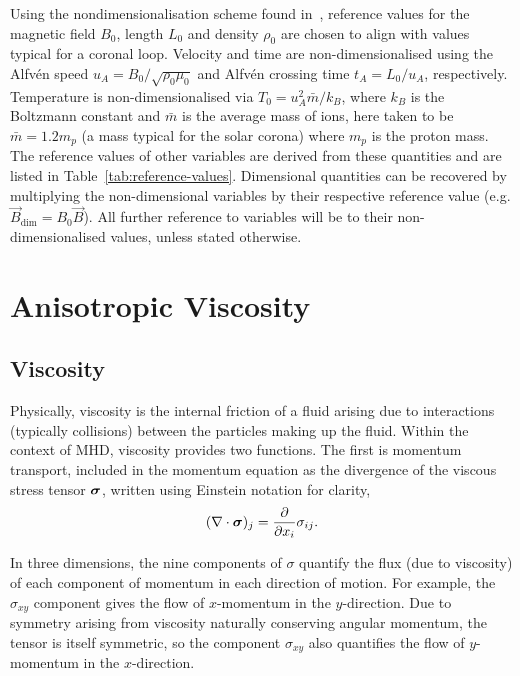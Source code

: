 Using the nondimensionalisation scheme found
in~\cite{arberStaggeredGridLagrangian2001}, reference values for the
magnetic field $B_0$, length $L_0$ and density $\rho_0$ are chosen to
align with values typical for a coronal loop. Velocity and time are
non-dimensionalised using the Alfv\'en speed $u_A = B_0 / \sqrt{\rho_0
  \mu_0}$ and Alfv\'en crossing time $t_A = L_0/u_A$,
respectively. Temperature is non-dimensionalised via $T_0 = u_A^2
\bar{m} / k_B$, where $k_B$ is the Boltzmann constant and $\bar{m}$ is
the average mass of ions, here taken to be $\bar{m} = 1.2m_p$ (a mass
typical for the solar corona) where $m_p$ is the proton mass. The
reference values of other variables are derived from these
quantities and are listed in Table~\ref{tab:reference-values}. Dimensional quantities can be recovered by multiplying the non-dimensional variables by their respective reference value (e.g. $\vec{B}_{\dim} = B_0 \vec{B}$). All further reference to variables will be to their non-dimensionalised values, unless stated otherwise.

\section{Anisotropic Viscosity}

\subsection{Viscosity}

Physically, viscosity is the internal friction of a fluid arising due to interactions (typically collisions) between the particles making up the fluid. Within the context of MHD, viscosity provides two functions. The first is momentum transport, included in the momentum equation as the divergence of the viscous stress tensor ${\bm \sigma}$, written using Einstein notation for clarity,
\begin{equation}
  \label{eq:viscous_momenum_transport}
  (\nabla \cdot {\bm \sigma})_j = \frac{\partial}{\partial x_i} \sigma_{ij}.
\end{equation}

In three dimensions, the nine components of $\sigma$ quantify the flux (due to viscosity) of each component of momentum in each direction of motion. For example, the $\sigma_{xy}$ component gives the flow of $x$-momentum in the $y$-direction. Due to symmetry arising from viscosity naturally conserving angular momentum, the tensor is itself symmetric, so the component $\sigma_{xy}$ also quantifies the flow of $y$-momentum in the $x$-direction.

